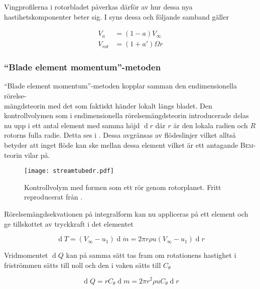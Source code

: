 Vingprofilerna i rotorbladet påverkas därför av hur dessa nya hastihetskomponenter beter sig. I  syns dessa och följande samband gäller

\begin{equations}
\begin{align}
    V_a &= (1 - a)V_{\infty}\\
    V_{rot} &= (1 + a')\Omega r
\end{align}
\end{equations}

\subsubsection{``Blade element momentum''-metoden}

``Blade element momentum''-metoden kopplar samman den endimensionella rörelse-\\mängdsteorin med det som faktiskt händer lokalt längs bladet. Den kontrollvolymen som i endimensionella rörelsemängdsteorin introducerade delas nu upp i ett antal element med samma höjd $\operatorname{d}\!r$ där $r$ är den lokala radien och $R$ rotorns fulla radie. Detta ses i . Dessa avgränsas av flödeslinjer vilket alltså betyder att inget flöde kan ske mellan dessa element vilket är ett antagande \textsc{Bem}-teorin vilar på.

\begin{figure}[!htb]
  \centering
  \texttt{[image: streamtubedr.pdf]}
  \caption{Kontrollvolym med formen som ett rör genom rotorplanet. Fritt reproducerat från \citet{hansen}.}
  \label{streamtubedr}
\end{figure}

Rörelsemängdsekvationen på integralform kan nu appliceras på ett element och ge tillskottet av tryckkraft i det elementet

\begin{equation}
\operatorname{d}\!T = (V_{\infty} - u_1)\operatorname{d}\!\dot{m} = 2 \pi r \rho u (V_{\infty} - u_1)\operatorname{d}\!r
\end{equation}

Vridmomentet $\operatorname{d}\!Q$ kan på samma sätt tas fram om rotationens hastighet i friströmmen sätts till noll och den i vaken sätts till $C_{\theta}$

\begin{equation}
\operatorname{d}\!Q = r C_{\theta} \operatorname{d}\!m = 2 \pi r^2 \rho u C_{\theta} \operatorname{d}\!r
\end{equation}


